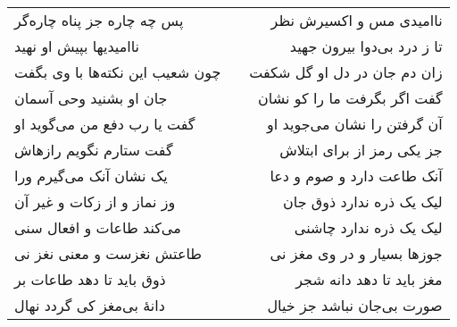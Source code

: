 \begin{center}
\begin{longtable}{l p{0.5cm} r}
پس چه چاره جز پناه چاره‌گر
&&
ناامیدی مس و اکسیرش نظر
\\
ناامیدیها بپیش او نهید
&&
تا ز درد بی‌دوا بیرون جهید
\\
چون شعیب این نکته‌ها با وی بگفت
&&
زان دم جان در دل او گل شکفت
\\
جان او بشنید وحی آسمان
&&
گفت اگر بگرفت ما را کو نشان
\\
گفت یا رب دفع من می‌گوید او
&&
آن گرفتن را نشان می‌جوید او
\\
گفت ستارم نگویم رازهاش
&&
جز یکی رمز از برای ابتلاش
\\
یک نشان آنک می‌گیرم ورا
&&
آنک طاعت دارد و صوم و دعا
\\
وز نماز و از زکات و غیر آن
&&
لیک یک ذره ندارد ذوق جان
\\
می‌کند طاعات و افعال سنی
&&
لیک یک ذره ندارد چاشنی
\\
طاعتش نغزست و معنی نغز نی
&&
جوزها بسیار و در وی مغز نی
\\
ذوق باید تا دهد طاعات بر
&&
مغز باید تا دهد دانه شجر
\\
دانهٔ بی‌مغز کی گردد نهال
&&
صورت بی‌جان نباشد جز خیال
\\
\end{longtable}
\end{center}
